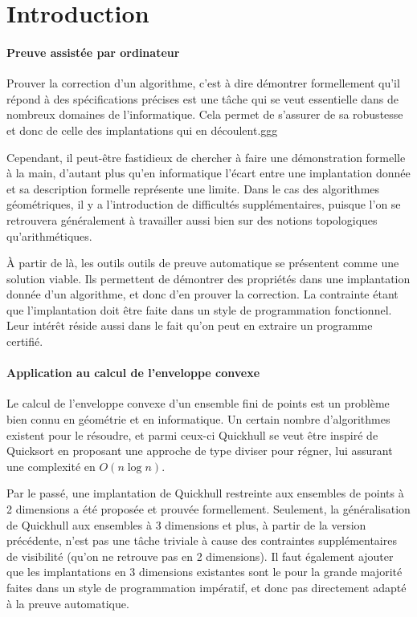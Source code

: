 \documentclass[]{article}
\begin{document}
\newpage

\newpage
\tableofcontents
\newpage

\section{Introduction}
\paragraph{Preuve assistée par ordinateur}
Prouver la correction d'un algorithme, c'est à dire démontrer formellement qu'il répond à des spécifications précises est une tâche qui se veut essentielle dans de nombreux domaines de l'informatique. Cela permet de s'assurer de sa robustesse et donc de celle des implantations qui en découlent.ggg

Cependant, il peut-être fastidieux de chercher à faire une démonstration formelle à la main, d'autant plus qu'en informatique l'écart entre une implantation donnée et sa description formelle représente une limite. Dans le cas des algorithmes géométriques, il y a l'introduction de difficultés supplémentaires, puisque l'on se retrouvera généralement à travailler aussi bien sur des notions topologiques qu'arithmétiques.

À partir de là, les outils outils de preuve automatique se présentent comme une solution viable. Ils permettent de démontrer des propriétés dans une implantation donnée d'un algorithme, et donc d'en prouver la correction. La contrainte étant que l'implantation doit être faite dans un style de programmation fonctionnel. Leur intérêt réside aussi dans le fait qu'on peut en extraire un programme certifié.

\paragraph{Application au calcul de l'enveloppe convexe}
Le calcul de l'enveloppe convexe d'un ensemble fini de points est un problème bien connu en géométrie et en informatique. Un certain nombre d'algorithmes existent pour le résoudre, et parmi ceux-ci Quickhull se veut être inspiré de Quicksort en proposant une approche de type diviser pour régner, lui assurant une complexité en $O(n\log{}n)$.

Par le passé, une implantation de Quickhull restreinte aux ensembles de points à 2 dimensions a été proposée et prouvée formellement. Seulement, la généralisation de Quickhull aux ensembles à 3 dimensions et plus, à partir de la version précédente, n'est pas une tâche triviale à cause des contraintes supplémentaires de visibilité (qu'on ne retrouve pas en 2 dimensions). Il faut également ajouter que les implantations en 3 dimensions existantes sont le pour la grande majorité faites dans un style de programmation impératif, et donc pas directement adapté à la preuve automatique.
\end{document}
